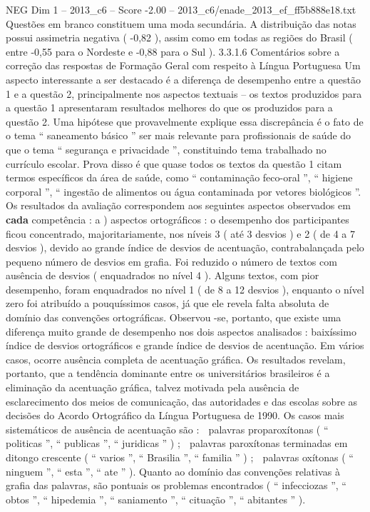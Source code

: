 \begin{textsample}{NEG Dim 1 – 2013\_c6 – Score -2.00 – 2013\_c6/enade\_2013\_ef\_ff5b888e18.txt}
Questões em branco constituem uma moda secundária.
A distribuição das notas possui assimetria negativa ( -0,82 ), assim como em todas as regiões do Brasil ( entre -0,55 para o Nordeste e -0,88 para o Sul ). 3.3.1.6 Comentários sobre a correção das respostas de Formação Geral com respeito à Língua Portuguesa Um aspecto interessante a ser destacado é a diferença de desempenho entre a questão 1 e a questão 2, principalmente nos aspectos textuais – os textos produzidos para a questão 1 apresentaram resultados melhores do que os produzidos para a questão 2.
Uma hipótese que provavelmente explique essa discrepância é o fato de o tema “ saneamento básico ” ser mais relevante para profissionais de saúde do que o tema “ segurança e privacidade ”, constituindo tema trabalhado no currículo escolar.
Prova disso é que quase todos os textos da questão 1 citam termos específicos da área de saúde, como “ contaminação feco-oral ”, “ higiene corporal ”, “ ingestão de alimentos ou água contaminada por vetores biológicos ”.
Os resultados da avaliação correspondem aos seguintes aspectos observados em \textbf{cada} competência : a ) aspectos ortográficos : o desempenho dos participantes ficou concentrado, majoritariamente, nos níveis 3 ( até 3 desvios ) e 2 ( de 4 a 7 desvios ), devido ao grande índice de desvios de acentuação, contrabalançada pelo pequeno número de desvios em grafia.
Foi reduzido o número de textos com ausência de desvios ( enquadrados no nível 4 ).
Alguns textos, com pior desempenho, foram enquadrados no nível 1 ( de 8 a 12 desvios ), enquanto o nível zero foi atribuído a pouquíssimos casos, já que ele revela falta absoluta de domínio das convenções ortográficas.
Observou -se, portanto, que existe uma diferença muito grande de desempenho nos dois aspectos analisados : baixíssimo índice de desvios ortográficos e grande índice de desvios de acentuação.
Em vários casos, ocorre ausência completa de acentuação gráfica.
Os resultados revelam, portanto, que a tendência dominante entre os universitários brasileiros é a eliminação da acentuação gráfica, talvez motivada pela ausência de esclarecimento dos meios de comunicação, das autoridades e das escolas sobre as decisões do Acordo Ortográfico da Língua Portuguesa de 1990.
Os casos mais sistemáticos de ausência de acentuação são :  palavras proparoxítonas ( “ politicas ”, “ publicas ”, “ juridicas ” ) ;  palavras paroxítonas terminadas em ditongo crescente ( “ varios ”, “ Brasilia ”, “ familia ” ) ;  palavras oxítonas ( “ ninguem ”, “ esta ”, “ ate ” ).
Quanto ao domínio das convenções relativas à grafia das palavras, são pontuais os problemas encontrados ( “ infecciozas ”, “ obtos ”, “ hipedemia ”, “ saniamento ”, “ cituação ”, “ abitantes ” ).

\end{textsample}
